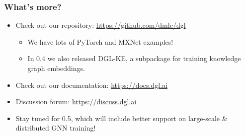 \documentclass[10pt,aspectratio=169]{beamer}
\begin{document}
	\begin{frame}
		\frametitle{What's more?}
		\begin{itemize}
			\item Check out our repository: \url{https://github.com/dmlc/dgl}
			\begin{itemize}
				\item We have lots of PyTorch and MXNet examples!
				\item In 0.4 we also released DGL-KE, a subpackage for training knowledge graph embeddings.
			\end{itemize}
			\item Check out our documentation: \url{https://docs.dgl.ai}
			\item Discussion forum: \url{https://discuss.dgl.ai}
			\item Stay tuned for 0.5, which will include better support on large-scale \& distributed GNN training!
		\end{itemize}
	\end{frame}
\end{document}
